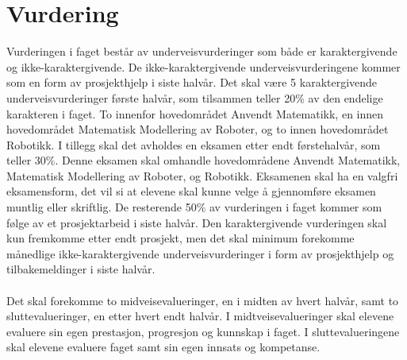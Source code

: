 \section*{Vurdering} \label{Sec: Vurdering}



        Vurderingen i faget består av underveisvurderinger som både er karaktergivende og ikke-karaktergivende. De ikke-karaktergivende underveisvurderingene kommer som en form av prosjekthjelp i siste halvår. Det skal være 5 karaktergivende underveisvurderinger første halvår, som tilsammen teller 20\% av den endelige karakteren i faget. To innenfor hovedområdet Anvendt Matematikk, en innen hovedområdet Matematisk Modellering av Roboter, og to innen hovedområdet Robotikk. I tillegg skal det avholdes en eksamen etter endt førstehalvår, som teller 30\%. Denne eksamen skal omhandle hovedområdene Anvendt Matematikk, Matematisk Modellering av Roboter, og Robotikk. Eksamenen skal ha en valgfri eksamensform, det vil si at elevene skal kunne velge å gjennomføre eksamen muntlig eller skriftlig. De resterende 50\% av vurderingen i faget kommer som følge av et prosjektarbeid i siste halvår. Den karaktergivende vurderingen skal kun fremkomme etter endt prosjekt, men det skal minimum forekomme månedlige ikke-karaktergivende underveisvurderinger i form av prosjekthjelp og tilbakemeldinger i siste halvår.\\\\
        Det skal forekomme to midveisevalueringer, en i midten av hvert halvår, samt to sluttevalueringer, en etter hvert endt halvår. I midtveisevalueringer skal elevene evaluere sin egen prestasjon, progresjon og kunnskap i faget. I sluttevalueringene skal elevene evaluere faget samt sin egen innsats og kompetanse.
